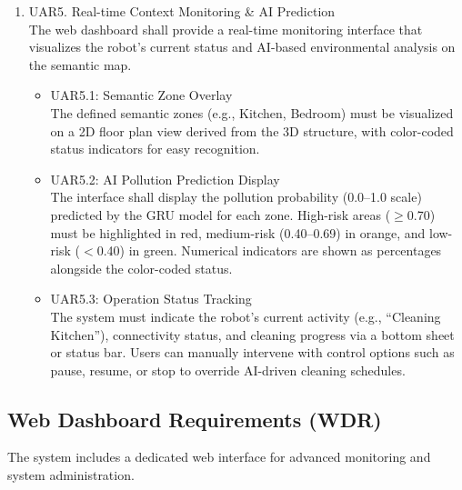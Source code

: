 \documentclass[conference]{IEEEtran}
\begin{document}
\begin{enumerate}
    \item [5)] UAR5. Real-time Context Monitoring \& AI Prediction \\
    The web dashboard shall provide a real-time monitoring interface that visualizes the robot's current status and AI-based environmental analysis on the semantic map.
    \begin{itemize}
        \item UAR5.1: Semantic Zone Overlay \\
        The defined semantic zones (e.g., Kitchen, Bedroom) must be visualized on a 2D floor plan view derived from the 3D structure, with color-coded status indicators for easy recognition.

        \item UAR5.2: AI Pollution Prediction Display \\
        The interface shall display the pollution probability (0.0–1.0 scale) predicted by the GRU model for each zone. High-risk areas ($\geq$0.70) must be highlighted in red, medium-risk (0.40–0.69) in orange, and low-risk ($<$0.40) in green. Numerical indicators are shown as percentages alongside the color-coded status.

        \item UAR5.3: Operation Status Tracking \\
        The system must indicate the robot's current activity (e.g., ``Cleaning Kitchen''), connectivity status, and cleaning progress via a bottom sheet or status bar. Users can manually intervene with control options such as pause, resume, or stop to override AI-driven cleaning schedules.
    \end{itemize}
\end{enumerate}

\subsection{Web Dashboard Requirements (WDR)}
The system includes a dedicated web interface for advanced monitoring and system administration.
\end{document}
